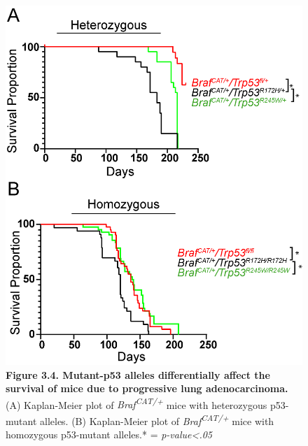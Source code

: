 \begin{figure}
\hypertarget{fig:3.4}{%
\centering
\includegraphics[width=1\textwidth,height=\textheight]{images/p53_3.png}
\caption{\textbf{Figure 3.4. Mutant-p53 alleles differentially affect the survival of mice due to progressive lung adenocarcinoma.} (A) Kaplan-Meier plot of \emph{Braf\textsuperscript{CAT/+}} mice with heterozygous p53-mutant alleles. (B) Kaplan-Meier plot of \emph{Braf\textsuperscript{CAT/+}} mice with homozygous p53-mutant alleles.* = \emph{p-value\textless.05}}\label{fig:3.4}
}
\end{figure}

